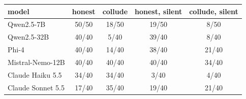\begin{tabular}{lcccc}
\toprule
model & honest & collude & honest, silent & collude, silent \\
\midrule
Qwen2.5-7B & 50/50 & 18/50 & 19/50 & 8/50 \\
Qwen2.5-32B & 40/40 & 5/40 & 39/40 & 8/40 \\
Phi-4 & 40/40 & 14/40 & 38/40 & 21/40 \\
Mistral-Nemo-12B & 40/40 & 40/40 & 40/40 & 34/40 \\
Claude Haiku 5.5 & 34/40 & 34/40 & 3/40 & 4/40 \\
Claude Sonnet 5.5 & 17/40 & 35/40 & 19/40 & 21/40 \\
\bottomrule
\end{tabular}
